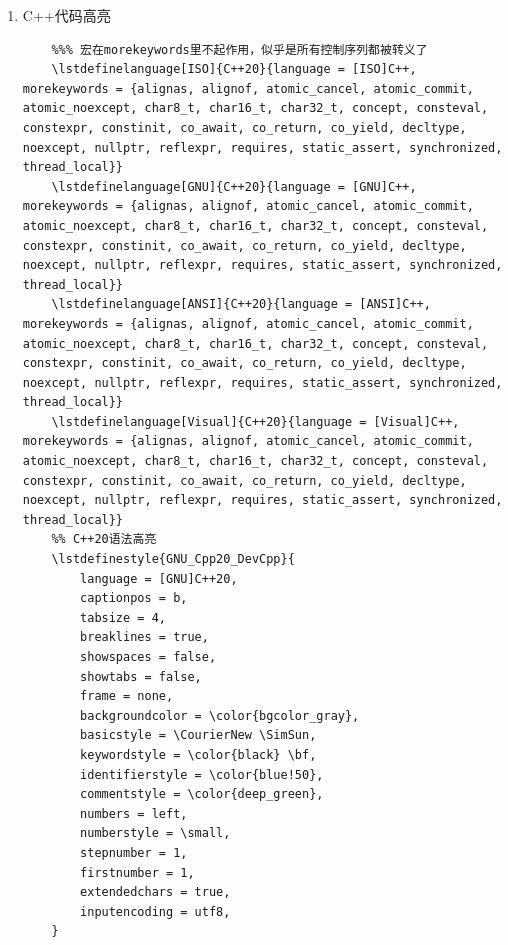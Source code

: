\begin{enumerate}
	\item C++代码高亮\\
	\begin{lstlisting}[style = LaTeX_TeXworks]
	%%% Tips: C++20关键字：alignas, alignof, and, and_eq, asm, atomic_cancel, atomic_commit, atomic_noexcept, auto, bitand, bitor, bool, break, case, catch, char, char8_t, char16_t, char32_t, class, compl, concept, const, consteval, constexpr, constinit, const_cast, continue, co_await, co_return, co_yield, decltype, default, delete, do, double, dynamic_cast, else, enum, explicit, export, extern, false, float, for, friend, goto, if, inline, int, long, mutable, namespace, new, noexcept, not, not_eq, nullptr, operator, or, or_eq, private, protected, public, reflexpr, register, reinterpret_cast, requires, return, short, signed, sizeof, static, static_assert, static_cast, struct, switch, synchronized, template, this, thread_local, throw, true, try, typedef, typeid, typename, union, unsigned, using, virtual, void, volatile, wchar_t, while, xor, xor_eq
	%%% 宏在morekeywords里不起作用，似乎是所有控制序列都被转义了
	\lstdefinelanguage[ISO]{C++20}{language = [ISO]C++, morekeywords = {alignas, alignof, atomic_cancel, atomic_commit, atomic_noexcept, char8_t, char16_t, char32_t, concept, consteval, constexpr, constinit, co_await, co_return, co_yield, decltype, noexcept, nullptr, reflexpr, requires, static_assert, synchronized, thread_local}}
	\lstdefinelanguage[GNU]{C++20}{language = [GNU]C++, morekeywords = {alignas, alignof, atomic_cancel, atomic_commit, atomic_noexcept, char8_t, char16_t, char32_t, concept, consteval, constexpr, constinit, co_await, co_return, co_yield, decltype, noexcept, nullptr, reflexpr, requires, static_assert, synchronized, thread_local}}
	\lstdefinelanguage[ANSI]{C++20}{language = [ANSI]C++, morekeywords = {alignas, alignof, atomic_cancel, atomic_commit, atomic_noexcept, char8_t, char16_t, char32_t, concept, consteval, constexpr, constinit, co_await, co_return, co_yield, decltype, noexcept, nullptr, reflexpr, requires, static_assert, synchronized, thread_local}}
	\lstdefinelanguage[Visual]{C++20}{language = [Visual]C++, morekeywords = {alignas, alignof, atomic_cancel, atomic_commit, atomic_noexcept, char8_t, char16_t, char32_t, concept, consteval, constexpr, constinit, co_await, co_return, co_yield, decltype, noexcept, nullptr, reflexpr, requires, static_assert, synchronized, thread_local}}
	%% C++20语法高亮
	\lstdefinestyle{GNU_Cpp20_DevCpp}{
		language = [GNU]C++20,
		captionpos = b,
		tabsize = 4,
		breaklines = true,
		showspaces = false,
		showtabs = false,
		frame = none,
		backgroundcolor = \color{bgcolor_gray},
		basicstyle = \CourierNew \SimSun,
		keywordstyle = \color{black} \bf,
		identifierstyle = \color{blue!50},
		commentstyle = \color{deep_green},
		numbers = left,
		numberstyle = \small,
		stepnumber = 1,
		firstnumber = 1,
		extendedchars = true,
		inputencoding = utf8,
	}	
	\end{lstlisting}
	
\end{enumerate}